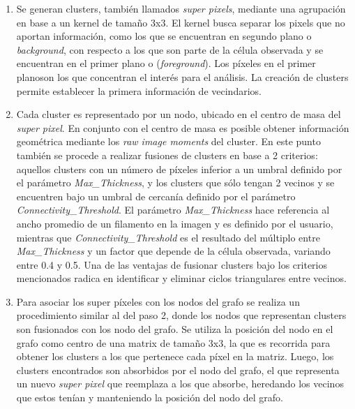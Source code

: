 \begin{enumerate}
    \item Se generan clusters, tambi\'en llamados {\it super pixels}, mediante una agrupaci\'on en base a un kernel de tama\~no 3x3. El kernel busca separar los pixels que no aportan informaci\'on, como los que se encuentran en segundo plano o {\it background}, con respecto a los que son parte de la c\'elula observada y se encuentran en el primer plano o ({\it foreground}). Los p\'ixeles en el primer planoson los que concentran el inter\'es para el an\'alisis. La creaci\'on de clusters permite establecer la primera informaci\'on de vecindarios.
    
    \item Cada cluster es representado por un nodo, ubicado en el centro de masa del {\it super pixel}. En conjunto con el centro de masa es posible obtener informaci\'on geom\'etrica mediante los {\it raw image moments} \cite{chaumette2004image} del cluster. En este punto tambi\'en se procede a realizar fusiones de clusters en base a 2 criterios: aquellos clusters con un n\'umero de p\'ixeles inferior a un umbral definido por el par\'ametro {\it Max\_Thickness}, y los clusters que s\'olo tengan 2 vecinos y se encuentren bajo un umbral de cercan\'ia definido por el par\'ametro {\it Connectivity\_Threshold}. El par\'ametro {\it Max\_Thickness} hace referencia al ancho promedio de un filamento en la imagen y es definido por el usuario, mientras que {\it Connectivity\_Threshold} es el resultado del m\'ultiplo entre {\it Max\_Thickness} y un factor que depende de la c\'elula observada, variando entre 0.4 y 0.5. Una de las ventajas de fusionar clusters bajo los criterios mencionados radica en identificar y eliminar ciclos triangulares entre vecinos.%
    
    \item Para asociar los super p\'ixeles con los nodos del grafo se realiza un procedimiento similar al del paso 2, donde los nodos que representan clusters son fusionados con los nodo del grafo. Se utiliza la posici\'on del nodo en el grafo como centro de una matrix de tama\~no 3x3, la que es recorrida para obtener los clusters a los que pertenece cada p\'ixel en la matriz. Luego, los clusters encontrados son absorbidos por el nodo del grafo, el que representa un nuevo {\it super pixel} que reemplaza a los que absorbe, heredando los vecinos que estos ten\'ian y manteniendo la posici\'on del nodo del grafo.
    
\end{enumerate}


